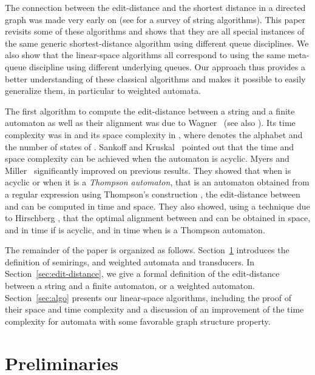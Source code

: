 \documentclass{llncs}
\newcommand{\0}{\overline{0}}
\newcommand{\1}{\overline{1}}
\newcommand{\+}{\oplus}
\renewcommand{\.}{\otimes}
\begin{document}
The connection between the edit-distance and the shortest distance in
a directed graph was made very early on (see
\cite{gusfield,crochemore-hancart-lecroq,crochemore-rytter,crochemore-rytter02}
for a survey of string algorithms). This paper revisits some of these
algorithms and shows that they are all special instances of the same
generic shortest-distance algorithm using different queue
disciplines. We also show that the linear-space algorithms all
correspond to using the same meta-queue discipline using different
underlying queues. Our approach thus provides a better understanding
of these classical algorithms and makes it possible to easily
generalize them, in particular to weighted automata.

The first algorithm to compute the edit-distance between a string 
and a finite automaton  as well as their alignment was due to
Wagner~\cite{wagner} (see also \cite{wagner-seiferas}). Its time
complexity was in  and its space complexity in
, where  denotes the alphabet
and  the number of states of . Sankoff and
Kruskal~\cite{sankoff} pointed out that the time and space complexity
 can be achieved when the automaton  is acyclic. Myers
and Miller~\cite{myers-miller89} significantly improved on previous
results. They showed that when  is acyclic or when it is a
\emph{Thompson automaton}, that is an automaton obtained from a
regular expression using Thompson's construction \cite{thompson}, the
edit-distance between  and  can be computed in  time
and  space. They also showed, using a technique due to
Hirschberg \cite{hirschberg}, that the optimal alignment between 
and  can be obtained in  space, and in 
time if  is acyclic, and in  time when  is
a Thompson automaton.

The remainder of the paper is organized as
follows. Section~\ref{sec:preliminaries} introduces the definition of
semirings, and weighted automata and transducers. In
Section~\ref{sec:edit-distance}, we give a formal definition of the
edit-distance between a string and a finite automaton, or a weighted
automaton. Section~\ref{sec:algo} presents our linear-space
algorithms, including the proof of their space and time complexity and
a discussion of an improvement of the time complexity for automata
with some favorable graph structure property.

\section{Preliminaries}
\label{sec:preliminaries}
\end{document}
